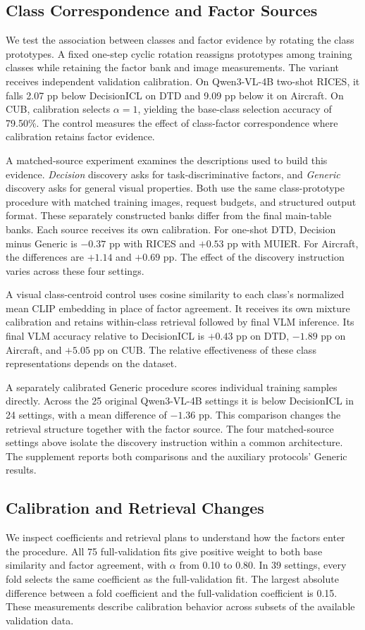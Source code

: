 \documentclass[10pt,twocolumn,letterpaper]{article}
\newcommand{\method}{DecisionICL\xspace}
\begin{document}
\subsection{Class Correspondence and Factor Sources}
\label{sec:controls}
We test the association between classes and factor evidence by rotating the class prototypes. A fixed one-step cyclic rotation reassigns prototypes among training classes while retaining the factor bank and image measurements. The variant receives independent validation calibration. On Qwen3-VL-4B two-shot RICES, it falls 2.07 pp below \method on DTD and 9.09 pp below it on Aircraft. On CUB, calibration selects $\alpha=1$, yielding the base-class selection accuracy of 79.50\%. The control measures the effect of class-factor correspondence where calibration retains factor evidence.

A matched-source experiment examines the descriptions used to build this evidence. \emph{Decision} discovery asks for task-discriminative factors, and \emph{Generic} discovery asks for general visual properties. Both use the same class-prototype procedure with matched training images, request budgets, and structured output format. These separately constructed banks differ from the final main-table banks. Each source receives its own calibration. For one-shot DTD, Decision minus Generic is $-0.37$ pp with RICES and $+0.53$ pp with MUIER. For Aircraft, the differences are $+1.14$ and $+0.69$ pp. The effect of the discovery instruction varies across these four settings.

A visual class-centroid control uses cosine similarity to each class's normalized mean CLIP embedding in place of factor agreement. It receives its own mixture calibration and retains within-class retrieval followed by final VLM inference. Its final VLM accuracy relative to \method is $+0.43$ pp on DTD, $-1.89$ pp on Aircraft, and $+5.05$ pp on CUB. The relative effectiveness of these class representations depends on the dataset.

A separately calibrated Generic procedure scores individual training samples directly. Across the 25 original Qwen3-VL-4B settings it is below \method in 24 settings, with a mean difference of $-1.36$ pp. This comparison changes the retrieval structure together with the factor source. The four matched-source settings above isolate the discovery instruction within a common architecture. The supplement reports both comparisons and the auxiliary protocols' Generic results.

\subsection{Calibration and Retrieval Changes}
\label{sec:calibrationanalysis}
We inspect coefficients and retrieval plans to understand how the factors enter the procedure. All 75 full-validation fits give positive weight to both base similarity and factor agreement, with $\alpha$ from 0.10 to 0.80. In 39 settings, every fold selects the same coefficient as the full-validation fit. The largest absolute difference between a fold coefficient and the full-validation coefficient is 0.15. These measurements describe calibration behavior across subsets of the available validation data.
\end{document}
